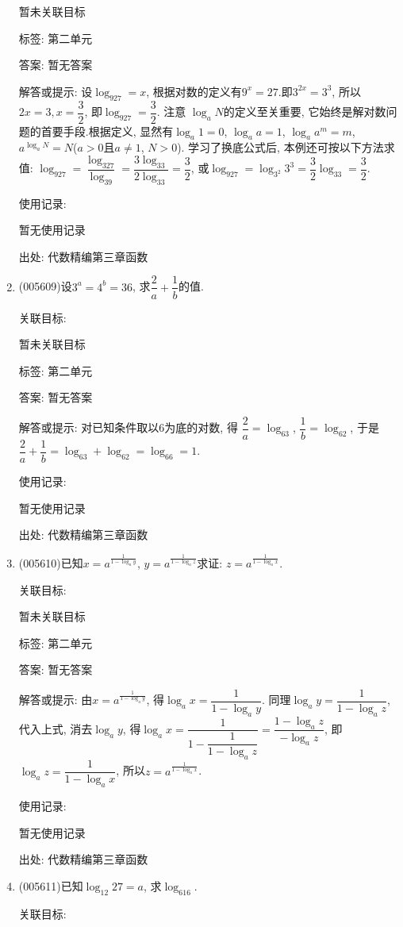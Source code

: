 \documentclass[10pt,a4paper]{article}
\begin{document}
\begin{enumerate}[1.]
暂未关联目标



标签: 第二单元

答案: 暂无答案

解答或提示: 设$\log_927=x$, 根据对数的定义有$9^x=27$.即$3^{2x}=3^3$,
所以$ 2x=3,x=\dfrac 32$, 即$\log_927=\dfrac 32$.
注意  $\log_aN$的定义至关重要, 它始终是解对数问题的首要手段.根据定义, 显然有$\log_a1=0$, $\log_aa=1$, $\log_aa^m=m$, $a^{\log_aN}=N$($a>0$且$a\ne 1$, $N>0$).
学习了换底公式后, 本例还可按以下方法求值:
$\log_927=\dfrac{\log_327}{\log_39}=\dfrac{3\log_33}{2\log_33}=\dfrac 32$, 或$\log_927=\log_{3^2}3^3=\dfrac 32\log_33=\dfrac 32$.

使用记录:

暂无使用记录


出处: 代数精编第三章函数
\item { (005609)}设$3^a=4^b=36$, 求$\dfrac 2a+\dfrac 1b$的值.


关联目标:

暂未关联目标



标签: 第二单元

答案: 暂无答案

解答或提示: 对已知条件取以6为底的对数, 得
$\dfrac 2a=\log_63$, $\dfrac 1b=\log_62$, 于是$\dfrac 2a+\dfrac 1b=\log_63+\log_62=\log_66=1$.

使用记录:

暂无使用记录


出处: 代数精编第三章函数
\item { (005610)}已知$x=a^{\frac 1{1-\log_ay}}$, $y=a^{\frac 1{1-\log_az}}$求证: $z=a^{\frac 1{1-\log_ax}}$.


关联目标:

暂未关联目标



标签: 第二单元

答案: 暂无答案

解答或提示: 由$x=a^{\frac 1{1-\log_ay}}$, 得$\log_ax=\dfrac 1{1-\log_ay}$.
同理$\log_ay=\dfrac 1{1-\log_az}$, 代入上式, 消去$\log_ay$,
得$\log_ax=\dfrac 1{1-\dfrac 1{1-\log_az}}=\dfrac{1-\log_az}{-\log_az}$, 即$\log_az=\dfrac 1{1-\log_ax}$, 所以$ z=a^{\frac 1{1-\log_ax}}$.

使用记录:

暂无使用记录


出处: 代数精编第三章函数
\item { (005611)}已知$\log_{12}27=a$, 求$\log_616$.


关联目标:


\end{enumerate}
\end{document}
